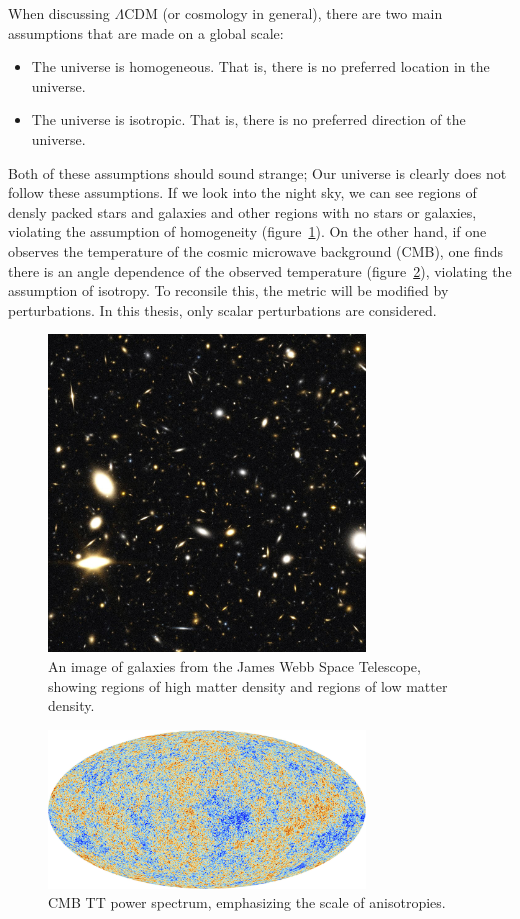 When discussing $\Lambda$CDM (or cosmology in general), there are two main assumptions that are made on a global scale:
\begin{itemize}
    \item The universe is homogeneous. That is, there is no preferred location in the universe.
    \item The universe is isotropic. That is, there is no preferred direction of the universe.
\end{itemize}
Both of these assumptions should sound strange; Our universe is clearly does not follow these assumptions. If we look into the night sky, we can see regions of densly packed stars and galaxies and other regions with no stars or galaxies, violating the assumption of homogeneity (figure~\ref{fig:galaxy_map}). On the other hand, if one observes the temperature of the cosmic microwave background (CMB), one finds there is an angle dependence of the observed temperature (figure~\ref{fig:cmb_tt_map}), violating the assumption of isotropy. To reconsile this, the metric will be modified by perturbations. In this thesis, only scalar perturbations are considered.
\begin{figure}[ht]
    \centering
    \includegraphics[width=0.75\textwidth]{plots/opo0220a.jpg}
    \caption{An image of galaxies from the James Webb Space Telescope, showing regions of high matter density and regions of low matter density.}
    \label{fig:galaxy_map}
\end{figure}
\begin{figure}[ht]
    \centering
    \includegraphics[width=0.75\textwidth]{plots/Planck_CMB.jpg}
    \caption{CMB TT power spectrum, emphasizing the scale of anisotropies.}
    \label{fig:cmb_tt_map}
\end{figure}


